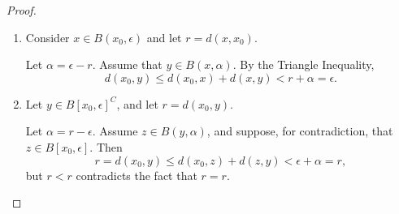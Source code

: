 \documentclass[notoc,notitlepage]{tufte-book}
\begin{document}
\begin{proof}
  \begin{enumerate}
    \item Consider $x \in B(x_0, \epsilon)$ and let $r = d(x, x_0)$.
      \begin{marginfigure}
        \begin{center}
        \end{center}
        \caption{Idea of proof for 1.\ in $\mathbb{R}^2$.}
      \end{marginfigure}
      Let $\alpha = \epsilon - r$. Assume that $y \in B(x, \alpha)$. By the Triangle Inequality,
      \begin{equation*}
        d(x_0, y) \leq d(x_0, x) + d(x, y) < r + \alpha = \epsilon.
      \end{equation*}

    \item Let $y \in B[x_0, \epsilon]^C$, and let $r = d(x_0, y)$.
      \begin{marginfigure}
        \begin{center}
        \end{center}
        \caption{Idea of proof for 2.\ in $\mathbb{R}^2$.}
      \end{marginfigure}
      Let $\alpha = r - \epsilon$. Assume $z \in B(y, \alpha)$, and suppose, for contradiction, that $z \in B[x_0, \epsilon]$. Then
      \begin{equation*}
        r = d(x_0, y) \leq d(x_0, z) + d(z, y) < \epsilon + \alpha = r,
      \end{equation*}
      but $r < r$ contradicts the fact that $r = r$.


\end{enumerate}
\end{proof}
\end{document}
